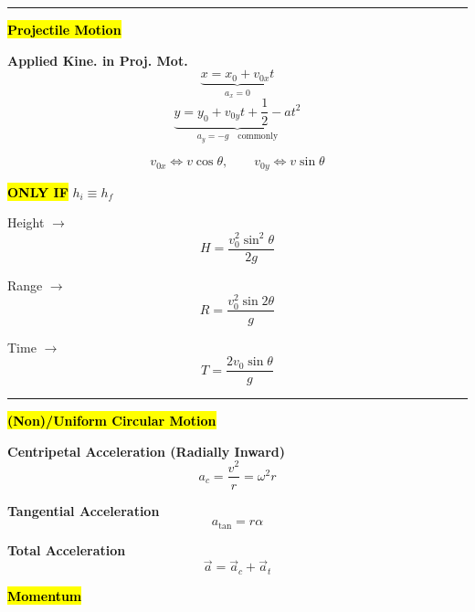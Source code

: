 \documentclass[	DIV=calc,%
							paper=a4,%
							fontsize=11pt,%
							twocolumn]{scrartcl} %
\newcommand{\hformbar}[1]{\vspace{5pt}\hrule\vspace{10pt}} %
\newcommand{\formdesc}[1]{\noindent\textbf{#1}}
\begin{document}
\hformbar{}

\formdesc{\hl{Projectile Motion}}

\textbf{Applied Kine. in Proj. Mot.}
\begin{equation}
    \underbrace{x=x_0+v_{0x}t}_{a_x=0}
\end{equation}
\begin{equation}
    \underbrace{y=y_0+v_{0y}t+\frac{1}{2}-at^2}_{a_y=-g\quad\text{commonly}}
\end{equation}

\begin{equation}
    v_{0x}\iff v\cos\theta,\qquad v_{0y}\iff v\sin\theta
\end{equation}

\textbf{\hl{ONLY IF}} $h_i\equiv h_f$

Height $\rightarrow$\begin{equation}
    H = \frac{v_0^2\sin^2\theta}{2g}
\end{equation}

Range $\rightarrow$\begin{equation}
     R = \frac{v_0^2\sin{2\theta}}{g}
\end{equation}

Time $\rightarrow$\begin{equation}
    T = \frac{2v_0\sin\theta}{g}
\end{equation}
\hformbar{}

\formdesc{\hl{(Non)/Uniform Circular Motion}}

\textbf{Centripetal Acceleration (Radially Inward)}
\begin{equation}
    a_c=\frac{v^2}{r}=\omega^2r
\end{equation}

\textbf{Tangential Acceleration}
\begin{equation}
    a_{\text{tan}}=r\alpha
\end{equation}

\textbf{Total Acceleration}
\begin{equation}
    \vec{a}=\vec a_c+\vec a_t
\end{equation}

\formdesc{\hl{Momentum}}
\end{document}
